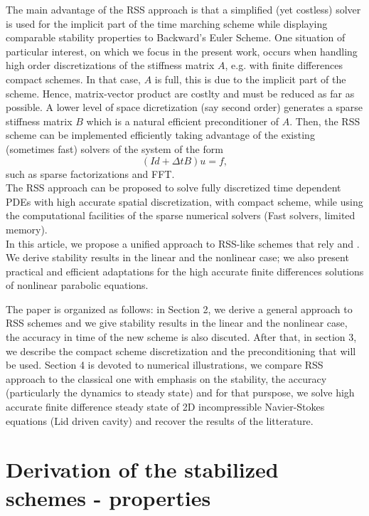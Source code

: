 \documentclass[11pt]{article}
\begin{document}
{The main advantage of the RSS approach is that a simplified (yet costless) solver is used for the implicit part of the time marching scheme while displaying comparable stability properties to Backward's Euler Scheme. One situation of particular interest, on which we focus in the present work, occurs when handling high order discretizations of the stiffness matrix $A$, e.g. with  finite differences compact schemes. In that case,  $A$ is full, this is due to the implicit part of the scheme. Hence, matrix-vector product are costlty and must be reduced as far as possible.  A lower level of space dicretization (say second order) generates a sparse stiffness matrix $B$ which is a natural efficient preconditioner of $A$.  Then, the RSS scheme can be implemented efficiently taking advantage of the existing  (sometimes fast) solvers of the system of the form 
$$
(Id +\Delta t B) u=f,
$$
such as sparse factorizations and FFT.
\\
The RSS approach can be proposed to solve fully discretized time dependent PDEs with high accurate spatial discretization, with compact scheme, while using the computational facilities of the sparse numerical solvers (Fast solvers, limited memory).\\

In this article, we propose a unified approach to RSS-like schemes that rely \cite{AverbuchCohenIsraeli} and \cite{CDGT}. We derive stability results in the linear and the nonlinear case;  we also present practical and efficient adaptations for the high accurate finite differences solutions of nonlinear parabolic equations.


The paper is organized as follows:
in Section 2,  we derive a general approach to RSS schemes and we give stability results in the linear and the nonlinear case,  the accuracy in time of the new scheme is also discuted. After that, in section 3, we describe the compact scheme discretization and the preconditioning that will be used. Section 4 is devoted to numerical illustrations, we compare RSS approach to the classical one with emphasis on the stability, the accuracy (particularly the dynamics to steady state) and for that purspose, we solve high accurate finite difference steady state of 2D incompressible Navier-Stokes equations (Lid driven cavity) and recover the results of the litterature.
\section{Derivation of the stabilized schemes - properties}
}
\end{document}
